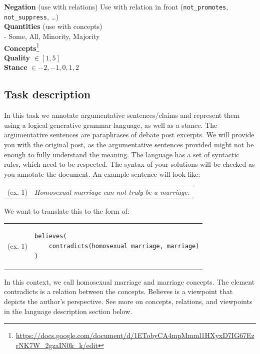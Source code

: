 \noindent \textbf{Negation} (use with relations)
Use with relation in front (\texttt{not\_promotes}, \texttt{not\_suppress}, \dots) \\
 
\noindent \textbf{Quantities} (use with concepts) \\
- Some, All, Minority, Majority \\
          
\noindent \textbf{Concepts}\footnote{\url{https://docs.google.com/document/d/1ETobyCA4mpMmml1HXyxD7IG67EzrNK7W_2gzaIN0k_k/edit}} \\

\noindent \textbf{Quality} $\in [1, 5]$ \\
 
\noindent \textbf{Stance} $ \in {-2, -1, 0, 1, 2}$ \\

\pagebreak

\subsection*{Task description}

In this task we annotate argumentative sentences/claims and represent them
using a logical generative grammar language, as well as a stance. The
argumentative sentences are paraphrases of debate post excerpts. We will
provide you with the original post, as the argumentative sentences provided
might not be enough to fully understand the meaning. 
The language has a set of syntactic rules, which need to be respected. The
syntax of your solutions will be checked as you annotate the document. 
An example sentence will look like:
\noindent\begin{tabular}{@{}lp{}}
(ex. 1) & \textit{Homosexual marriage can not truly be a marriage.}
\end{tabular} \vspace{0.4cm}

\noindent We want to translate this to the form of: 

\begin{tabular}{@{}m{1.5cm}  m{4.5cm}}
(ex. 1) &  \begin{verbatim}
believes(
    contradicts(homosexual marriage, marriage)
)
\end{verbatim}
\end{tabular}

In this context, we call homosexual marriage and marriage concepts. The element
contradicts is a relation between the concepts. Believes is a viewpoint that
depicts the author's perspective. See more on concepts, relations, and
viewpoints in the language description section below. 

